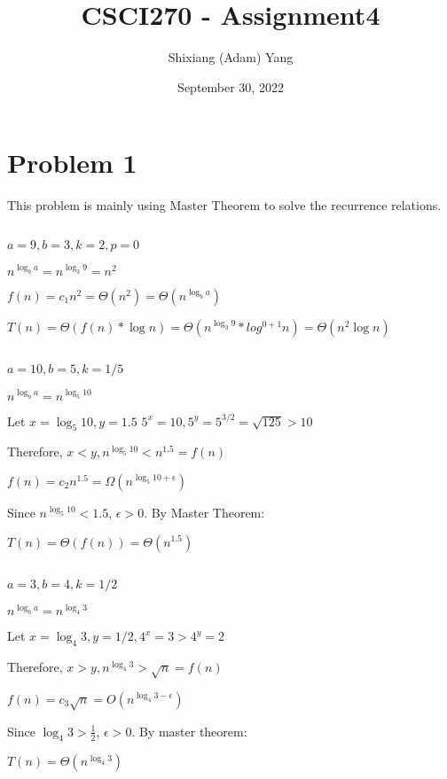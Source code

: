 \documentclass{article}
\author{Shixiang (Adam) Yang}
\date{September 30, 2022}
\title{CSCI270 - Assignment4}
\begin{document}
 \maketitle
\section{Problem 1}
This problem is mainly using Master Theorem to solve the recurrence relations.
\subsection{}
$a = 9, b = 3, k = 2, p = 0$

$n^{\log_b{a}} = n^{\log_3{9}} = n^2$

$f(n) = c_1n^2=\Theta(n^2) = \Theta(n^{\log_b{a}})$

$T(n) = \Theta(f(n)*\log{n}) = \Theta(n^{\log_3{9}}*log^{0+1}{n}) = \Theta(n^2\log{n})$

\subsection{}

$a=10, b=5, k = 1/5$

$n^{\log_b{a}}=n^{\log_5{10}}$

Let $x = \log_5{10}, y = 1.5$
$5^x = 10, 5^y = 5^{3/2} = \sqrt{125} > 10$

Therefore, $x < y, n^{\log_5{10}} < n^{1.5} = f(n)$

$f(n) = c_2n^{1.5} = \Omega(n^{\log_5{10}+\epsilon})$

Since $n^{\log_5{10}} < 1.5$, $\epsilon >0$. By Master Theorem:

$T(n) = \Theta(f(n)) = \Theta(n^{1.5})$

\subsection{}

$a=3,b=4,k=1/2$

$n^{\log_b{a}} = n^{\log_4{3}}$

Let $x=\log_4{3}, y = 1/2, 4^x = 3 > 4^y = 2$

Therefore, $x>y, n^{\log_4{3}} > \sqrt{n} = f(n)$

$f(n)=c_3\sqrt{n}=O(n^{\log_4{3}-\epsilon})$

Since $\log_4{3} > \frac{1}{2}$, $\epsilon > 0$. By master theorem:

$T(n)=\Theta(n^{\log_4{3}})$
\end{document}
